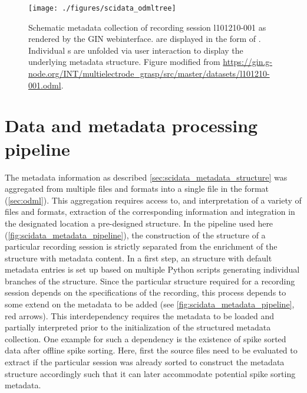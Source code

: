 \begin{figure}
 \texttt{[image: ./figures/scidata\_odmltree]}
 \caption[Schematic metadata collection of session l101210-001]{Schematic metadata collection of recording session l101210-001 as rendered by the GIN webinterface.  are displayed in the form of . Individual s are unfolded via user interaction to display the underlying metadata structure. Figure modified from \url{https://gin.g-node.org/INT/multielectrode_grasp/src/master/datasets/l101210-001.odml}.}
 \label{fig:scidata_l101210odml}
\end{figure}

\section{Data and metadata processing pipeline}
\label{sec:r2g_preprocessing_pipeline}
The metadata information as described \cref{sec:scidata_metadata_structure} was aggregated from multiple files and formats into a single file in the  format (\cref{sec:odml}). This aggregation requires access to, and interpretation of a variety of files and formats, extraction of the corresponding information and integration in the designated location a pre-designed  structure. In the pipeline used here (\cref{fig:scidata_metadata_pipeline}), the construction of the  structure of a particular recording session is strictly separated from the enrichment of the structure with metadata content. In a first step, an  structure with default metadata entries is set up based on multiple Python scripts generating individual branches of the  structure. Since the particular structure required for a recording session depends on the specifications of the recording, this process depends to some extend on the metadata to be added (see \cref{fig:scidata_metadata_pipeline}, red arrows). This interdependency requires the metadata to be loaded and partially interpreted prior to the initialization of the structured metadata collection. One example for such a dependency is the existence of spike sorted data after offline spike sorting. Here, first the source files need to be evaluated to extract if the particular session was already sorted to construct the metadata structure accordingly such that it can later accommodate potential spike sorting metadata.

